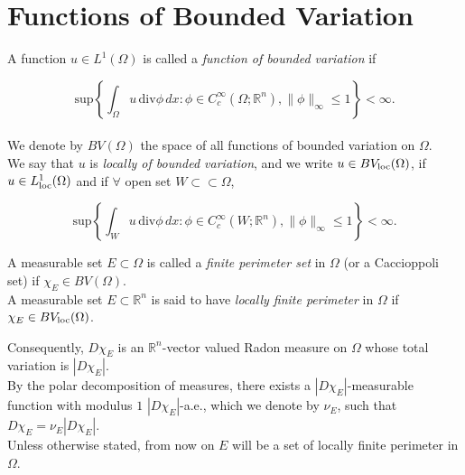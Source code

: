 \section{Functions of Bounded Variation}

\begin{definition} A function $u \in L^{1}(\Omega)$ is called a {\em function of bounded variation} if

\[ \mathrm{sup}\left \{ \int_{\Omega} u\, \mathrm{div}\phi\, dx : \phi \in C_{c}^{\infty}(\Omega; \mathbb{R}^{n}), \|\phi\|_{\infty} \le 1 \right \} < \infty. \]
\\
We denote by $BV(\Omega)$ the space of all functions of bounded variation on $\Omega$.
\\
We say that $u$ is {\em locally of bounded variation}, and we write $u \in BV_{\rm loc}(\Omega)$, if $u \in L^{1}_{\rm loc}(\Omega)$ and if $\forall$ open set $W \subset \subset \Omega$,

\[ \mathrm{sup}\left \{ \int_{W} u\, \mathrm{div}\phi\, dx : \phi \in C_{c}^{\infty}(W; \mathbb{R}^{n}), \|\phi\|_{\infty} \le 1 \right \} < \infty. \] 
\end{definition}

\begin{definition} A measurable set $E \subset \Omega$ is called a {\em finite perimeter set} in $\Omega$ (or a Caccioppoli set) if $\chi_{E} \in BV(\Omega)$.
\\
A measurable set $E \subset \mathbb{R}^{n}$ is said to have {\em locally finite perimeter} in $\Omega$ if $\chi_{E} \in BV_{\rm loc}(\Omega)$.
\end{definition}

Consequently, $D\chi_{E}$ is an $\mathbb{R}^{n}$-vector valued Radon measure on $\Omega$ whose total variation is $|D\chi_{E}|$.
\\
By the polar decomposition of measures, there exists a $|D\chi_{E}|$-measurable function with modulus $1$ $|D\chi_{E}|$-a.e., which we denote by $\nu_{E}$, such that $D\chi_{E} = \nu_{E} |D\chi_{E}|$.
\\
Unless otherwise stated, from now on $E$ will be a set of locally finite perimeter in $\Omega$.

